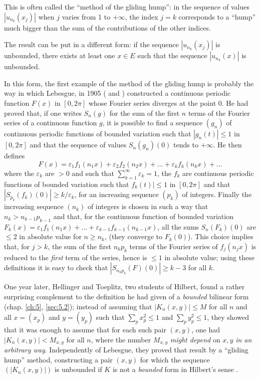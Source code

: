 \documentclass[12pt,a4paper,leqno,twoside]{extbook}
\begin{document}
This is often called the ``method of the gliding hump'': in the sequence of values \(|u_{n_k}(x_j)|\) when \(j\) varies from 1 to \(+\infty\), the index \(j = k\) corresponds to a ``hump'' much bigger than the sum of the contributions of the other indices.

The result can be put in a different form: if the sequence \(|u_{n_k}(x_j)|\) is unbounded, there exists at least one \(x \in E\) such that the sequence \(|u_{n_k}(x)|\) is unbounded.

In this form, the first example of the method of the gliding hump is probably the way in which Lebesgue, in 1905 (\cite[vol.~III, p.~101]{138} and \cite[p.~86--88]{139}) constructed a continuous periodic function \(F(x)\) in \([0,2\pi]\) whose Fourier series diverges at the point 0. He had proved that, if one writes \(S_n(g)\) for the sum of the first \(n\) terms of the Fourier series of a continuous function \(g\), it is possible to find a sequence \((g_n)\) of continuous periodic functions of bounded variation such that \(|g_n(t)| \leq 1\) in \([0,2\pi]\) and that the sequence of values \(S_n(g_n)(0)\) tends to \(+\infty\). He then defines
\[
    F(x) = \varepsilon_1 f_1(n_1 x) + \varepsilon_2 f_2(n_2 x) + \ldots + \varepsilon_k f_k(n_k x) + \ldots
\]
where the \(\varepsilon_k\) are \(> 0\) and such that \(\sum\limits_{k=1}^\infty \varepsilon_k = 1\), the \(f_k\) are continuous periodic functions of bounded variation such that \(f_k(t)| \leq 1\) in \([0,2\pi]\) and that \(\left|S_{p_k}(f_k)(0)\right| \geq k/\varepsilon_k\), for an increasing sequence \((p_k)\) of integers. Finally the increasing sequence \((n_k)\) of integers is chosen in such a way that \(n_k > n_{k-1} p_{k-1}\) and that, for the continuous function of bounded variation \(F_k(x) = \varepsilon_1 f_1(n_1 x) + \ldots + \varepsilon_{k-1} f_{k-1}(n_{k-1} x)\), all the sums \(S_n(F_k)(0)\) are \(\leq 2\) in absolute value for \(n \geq n_k\), (they converge to \(F_k(0)\)). This choice implies that, for \(j > k\), the sum of the first \(n_k p_k\) terms of the Fourier series of \(f_j(n_j x)\) is reduced to the \emph{first} term of the series, hence is \(\leq 1\) in absolute value; using these definitions it is easy to check that \(\left|S_{n_k p_k}(F)(0)\right| \geq k-3\) for all \(k\).

One year later, Hellinger and Toeplitz, two students of Hilbert, found a rather surprising complement to the definition he had given of a \emph{bounded} bilinear form (chap. \ref{ch:5}, \ref{sec:5.2}); instead of assuming that \(|K_n(x,y)| \leq M\) for all \(n\) and all \(x = (x_p)\) and \(y = (y_p)\) such that \(\sum\limits_p x_p^2 \leq 1\) and \(\sum\limits_p y_p^2 \leq 1\), they showed that it was enough to assume that for each such pair \((x,y)\), one had \(|K_n(x,y)| < M_{x,y}\) for all \(n\), where the number \(M_{x,y}\) \emph{might depend} on \(x, y\) \emph{in an arbitrary way}. Independently of Lebesgue, they proved that result by a ``gliding hump'' method, constructing a pair \((x,y)\) for which the sequence \((|K_n(x,y)|)\) is unbounded if \(K\) is not a \emph{bounded} form in Hilbert's sense \cite{106}.
\end{document}
